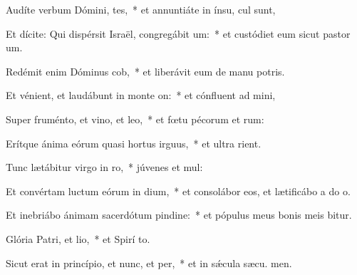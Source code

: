 \item Audíte verbum Dómini, tes,~* et annuntiáte in ínsu,  cul sunt,
\item Et dícite: Qui dispérsit Israël, congregábit um:~* et custódiet eum sicut pastor  um.
\item Redémit enim Dóminus cob,~* et liberávit eum de manu potris.
\item Et vénient, et laudábunt in monte on:~* et cónfluent ad  mini,
\item Super fruménto, et vino, et leo,~* et fœtu pécorum et rum:
\item Erítque ánima eórum quasi hortus irguus,~* et ultra  rient.
\item Tunc lætábitur virgo in ro,~* júvenes et  mul:
\item Et convértam luctum eórum in dium,~* et consolábor eos, et lætificábo a do o.
\item Et inebriábo ánimam sacerdótum pindine:~* et pópulus meus bonis meis bitur.
\item Glória Patri, et lio,~* et Spirí to.
\item Sicut erat in princípio, et nunc, et per,~* et in sǽcula sæcu. men.
